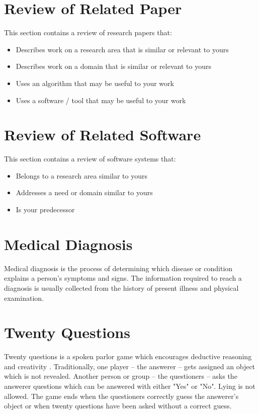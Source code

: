 \section{Review of Related Paper}
This section contains a review of research papers that:
%
%
\begin{itemize}
\item Describes work on a research area that is similar or relevant to yours
\item Describes work on a domain that is similar or relevant to yours
\item Uses an algorithm that may be useful to your work
\item Uses a software / tool that may be useful to your work
\end{itemize}

\section{Review of Related Software}
This section contains a review of software systems that:
%
%
\begin{itemize}
   \item Belongs to a research area similar to yours
   \item Addresses a need or domain similar to yours
   \item Is your predecessor
\end{itemize}


\section{Medical Diagnosis}
Medical diagnosis is the process of determining which disease or condition explains a person's symptoms and signs. 
The information required to reach a diagnosis is usually collected from the history of present illness and physical examination.

\section{Twenty Questions}
Twenty questions is a spoken parlor game which encourages deductive reasoning and creativity \cite{wiki:twenty_questions}.
Traditionally, one player -- the answerer -- gets assigned an object which is not revealed.
Another person or group -- the questioners -- asks the answerer questions which can be answered with either "Yes" or "No". 
Lying is not allowed.
The game ends when the questioners correctly guess the answerer's object or when twenty questions have been asked without a correct guess.

